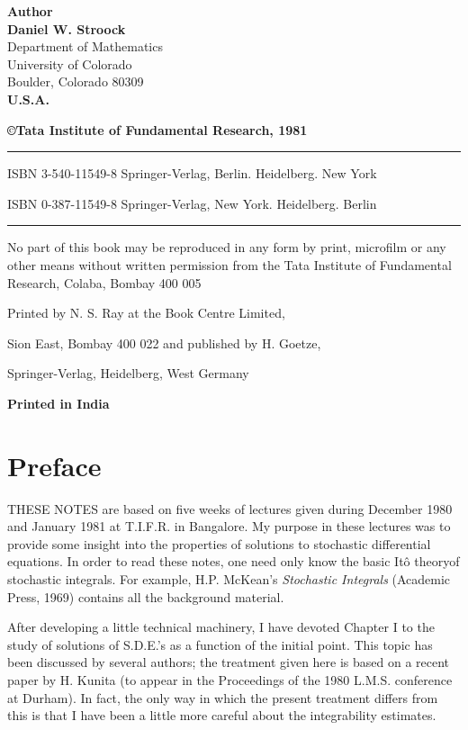 \thispagestyle{empty}
\begin{center}
{\bf Author}\\[5pt]
{\large\bf Daniel W. Stroock}\\[5pt]
{Department of Mathematics}\\[3pt]
{University of Colorado}\\[3pt]
{Boulder, Colorado 80309}\\[3pt]
{\bf U.S.A.}

\vfill

{\large\bf \copyright Tata Institute of Fundamental Research, 1981}


\rule{\textwidth}{.5pt}

ISBN 3-540-11549-8 Springer-Verlag, Berlin. Heidelberg. New York

ISBN 0-387-11549-8 Springer-Verlag, New York. Heidelberg. Berlin

\rule{\textwidth}{.5pt}

\vfill

\parbox{0.7\textwidth}{
No part of this book may be reproduced in any form by print, microfilm
or any other means without written permission from the Tata Institute
of Fundamental Research, Colaba, Bombay 400 005
}
\vfill

Printed by N. S. Ray at the Book Centre Limited,

Sion East, Bombay 400 022 and published by H. Goetze,

Springer-Verlag, Heidelberg, West Germany

\bigskip

{\large\bf Printed in India}
\end{center}

\eject

\thispagestyle{empty}

\chapter*{Preface}

THESE NOTES are based on five weeks of lectures given during December
1980 and January 1981 at T.I.F.R. in Bangalore. My purpose in these
lectures was to provide some insight into the properties of solutions
to stochastic differential equations. In order to read these notes,
one need only know the basic It\^o theoryof stochastic integrals. For
example, H.P. McKean's {\em Stochastic Integrals} (Academic Press,
1969) contains all the background material.

After developing a little technical machinery, I have devoted Chapter
I to the study of solutions of S.D.E.'s as a function of the initial
point. This topic has been discussed by several authors; the treatment
given here is based on a recent paper by H. Kunita (to appear in the
Proceedings of the 1980 L.M.S. conference at Durham). In fact, the
only way in which the present treatment differs from this is that I
have been a little more careful about the integrability estimates.

